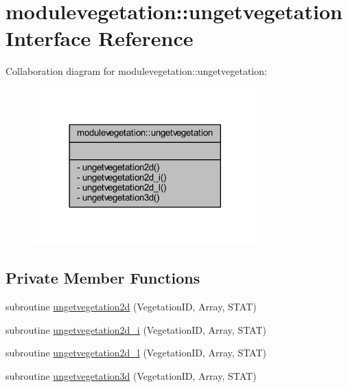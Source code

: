 \hypertarget{interfacemodulevegetation_1_1ungetvegetation}{}\section{modulevegetation\+:\+:ungetvegetation Interface Reference}
\label{interfacemodulevegetation_1_1ungetvegetation}


Collaboration diagram for modulevegetation\+:\+:ungetvegetation\+:\nopagebreak
\begin{figure}[H]
\begin{center}
\leavevmode
\includegraphics[width=245pt]{interfacemodulevegetation_1_1ungetvegetation__coll__graph}
\end{center}
\end{figure}
\subsection*{Private Member Functions}
\begin{DoxyCompactItemize}
\item 
subroutine \mbox{\hyperlink{interfacemodulevegetation_1_1ungetvegetation_a25dfbd901ee8f599092638eb93a00bb7}{ungetvegetation2d}} (Vegetation\+ID, Array, S\+T\+AT)
\item 
subroutine \mbox{\hyperlink{interfacemodulevegetation_1_1ungetvegetation_aa4753fcc3e1d554bc42cbea4aecd1f23}{ungetvegetation2d\+\_\+i}} (Vegetation\+ID, Array, S\+T\+AT)
\item 
subroutine \mbox{\hyperlink{interfacemodulevegetation_1_1ungetvegetation_a3a5f3e05f2ca22483ea60985478a2d99}{ungetvegetation2d\+\_\+l}} (Vegetation\+ID, Array, S\+T\+AT)
\item 
subroutine \mbox{\hyperlink{interfacemodulevegetation_1_1ungetvegetation_af47a29473765a05b9f2a60c079df4e1e}{ungetvegetation3d}} (Vegetation\+ID, Array, S\+T\+AT)
\end{DoxyCompactItemize}


